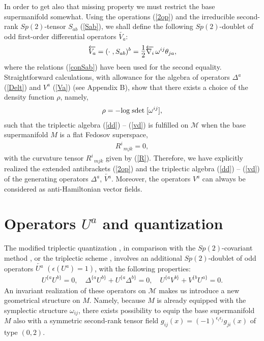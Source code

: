 \documentclass[a4paper,11pt]{article}
\begin{document}
In order to get also that missing property we must restrict the
base supermanifold somewhat.  Using the operations (\ref{2op}) and the
irreducible second-rank $Sp(2)$-tensor $S_{ab}$ (\ref{Sab}), we
shall define the following $Sp(2)$-doublet of odd first-order
differential operators $\overleftarrow{V_a}$:
\begin{eqnarray}
\label{Va} \overleftarrow{V_a}=(\cdot
\;,S_{ab})^b=\hbox{\Large$\frac{1}{2}$}\overleftarrow{\nabla_i}\,\omega^{ij}\theta_{ja},
\end{eqnarray}
where the relations (\ref{conSab}) have been used for the second equality.
Straightforward calculations, with allowance for the algebra of operators $%
\Delta ^{a}$ (\ref{Delt}) and $V^{a}$ (\ref{Va}) (see Appendix B), show that
there exists a choice of the density function $\rho $, namely,
\begin{eqnarray}
\label{rho}
\rho=-{\rm log}\;{\rm sdet}\;[\omega^{ij}],
\end{eqnarray}
such that the triplectic algebra (\ref{dd}) -- (\ref{vd}) is fulfilled on $\mathcal{M%
}$ when the base supermanifold $M$ is a flat Fedosov superspace,
\begin{eqnarray}
\label{R=0} R^i_{\;\;mjk}=0,
\end{eqnarray}
with the curvature tensor $R_{\;\;mjk}^{i}$ given by (\ref{R}). Therefore,
we have explicitly realized the extended antibrackets (\ref{2op}) and the
triplectic algebra (\ref{dd}) -- (\ref{vd}) of the generating operators $%
\Delta ^{a}$, $\overleftarrow{V^{a}}$. Moreover, the operators
$V^{a}$ can always be considered as anti-Hamiltonian vector
fields.

\section{Operators $U^a$ and quantization}

The modified triplectic quantization \cite{mod3pl}, in comparison
with the $Sp(2)$-covariant method \cite{BLT}, or the triplectic
scheme \cite{3pl}, involves an additional $Sp(2)$-doublet of odd
operators $\overleftarrow{U^{a}}$ $(\epsilon (U^{a})=1)$, with the
following properties:
\begin{eqnarray}
\label{mal}
U^{\{a}U^{b\}}=0,\quad \Delta^{\{a} U^{b\}} + U^{\{a}\Delta^{b\}} = 0,
\quad U^{\{a}V^{b\}} +V^{\{b}U^{a\}}=0.
\end{eqnarray}
An invariant realization of these operators on $\mathcal{M}$ makes us
introduce a new geometrical structure on $M$. Namely, because $M$ is already
equipped with the symplectic structure $\omega _{ij}$,
there exists possibility to equip the base supermanifold $M$ also with a
symmetric second-rank tensor field $g_{ij}(x)=(-1)^{\epsilon _{i}\epsilon
_{j}}g_{ji}(x)$ of type $(0,2)$.
\end{document}
